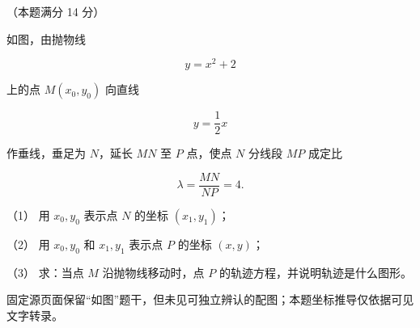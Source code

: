 \begin{question}
（本题满分 14 分）

如图，由抛物线

\nopagebreak[4]
\[
y=x^2+2
\]

上的点 $M(x_0,y_0)$ 向直线

\nopagebreak[4]
\[
y=\frac12x
\]

作垂线，垂足为 $N$，延长 $MN$ 至 $P$ 点，使点 $N$ 分线段 $MP$ 成定比

\nopagebreak[4]
\[
\lambda=\frac{MN}{NP}=4.
\]

（1） 用 $x_0,y_0$ 表示点 $N$ 的坐标 $(x_1,y_1)$；

（2） 用 $x_0,y_0$ 和 $x_1,y_1$ 表示点 $P$ 的坐标 $(x,y)$；

（3） 求：当点 $M$ 沿抛物线移动时，点 $P$ 的轨迹方程，并说明轨迹是什么图形。

\begin{gktip}
固定源页面保留“如图”题干，但未见可独立辨认的配图；本题坐标推导仅依据可见文字转录。
\end{gktip}

\end{question}